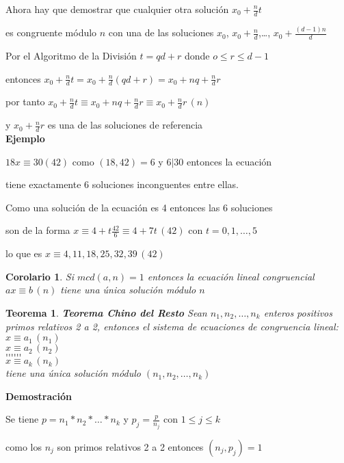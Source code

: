 \documentclass[a4paper,12pt]{report}
\newtheorem*{teo}{Teorema}
\newtheorem*{cor}{Corolario}
\begin{document}
Ahora hay que demostrar que cualquier otra solución $x_0 + \frac{n}{d}t$ 

es congruente módulo $n$ con una de las soluciones $x_0$, $x_0 + \frac{n}{d}$,\dots, $x_0 + \frac{(d-1)n}{d}$

Por el Algoritmo de la División  $t=qd+r$ donde $o\leq r \leq d-1$

entonces $x_0 + \frac{n}{d}t = x_0 + \frac{n}{d}(qd+r) =  x_0 + nq + \frac{n}{d}r$

por tanto $x_0 + \frac{n}{d}t \equiv x_0 + nq + \frac{n}{d}r \equiv x_0 + \frac{n}{d}r \, (n)$

y $x_0 + \frac{n}{d}r$ es una de las soluciones de referencia\\

\textbf{Ejemplo}

$18x\equiv 30 (42)$ como $(18,42)=6$ y $6|30$ entonces la ecuación 

tiene exactamente 6 soluciones inconguentes entre ellas.

Como una solución de la ecuación es 4 entonces las 6 soluciones 

son  de la forma $x\equiv 4 + t\frac{42}{6} \equiv 4 +7t \, (42)$ con $t=0,1,\dots,5$

lo que es $x\equiv 4, 11, 18, 25, 32, 39 \, (42)$



\begin{cor}
 Si $mcd(a,n)=1$ entonces la ecuación lineal congruencial $ax\equiv b \, (n)$ tiene una única solución módulo $n$
\end{cor}

\begin{teo}
 \textbf{Teorema Chino del Resto} Sean $n_1,n_2,\dots,n_k$ enteros positivos primos relativos 2 a 2, entonces el sistema de ecuaciones de congruencia lineal:\\
 $x\equiv a_1 \, (n_1)$\\
 $x\equiv a_2 \, (n_2)$\\
 $\dots\dots$\\
 $\dots\dots$\\
 $x\equiv a_k \, (n_k)$\\
 tiene una única solución módulo $(n_1,n_2,\dots,n_k)$
\end{teo}

\textbf{Demostración}

Se tiene $p=n_1*n_2*\dots *n_k$ y $p_j=\frac{p}{n_j}$ con $1\leq j \leq k$

como los $n_j$ son primos relativos 2 a 2 entonces $(n_j,p_j)=1$
\end{document}
